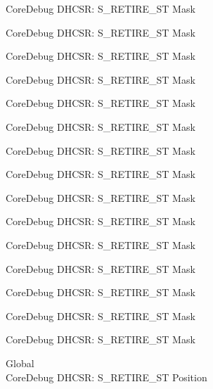 \begin{DoxyRefList}
\label{deprecated__deprecated000112}%
%
Core\+Debug DHCSR\+: S\+\_\+\+RETIRE\+\_\+\+ST Mask 

\label{deprecated__deprecated000166}%
%
Core\+Debug DHCSR\+: S\+\_\+\+RETIRE\+\_\+\+ST Mask 

\label{deprecated__deprecated000251}%
%
Core\+Debug DHCSR\+: S\+\_\+\+RETIRE\+\_\+\+ST Mask 

\label{deprecated__deprecated000308}%
%
Core\+Debug DHCSR\+: S\+\_\+\+RETIRE\+\_\+\+ST Mask 

\label{deprecated__deprecated000384}%
%
Core\+Debug DHCSR\+: S\+\_\+\+RETIRE\+\_\+\+ST Mask 

\label{deprecated__deprecated000463}%
%
Core\+Debug DHCSR\+: S\+\_\+\+RETIRE\+\_\+\+ST Mask 

\label{deprecated__deprecated000565}%
%
Core\+Debug DHCSR\+: S\+\_\+\+RETIRE\+\_\+\+ST Mask 

\label{deprecated__deprecated000690}%
%
Core\+Debug DHCSR\+: S\+\_\+\+RETIRE\+\_\+\+ST Mask 

\label{deprecated__deprecated000790}%
%
Core\+Debug DHCSR\+: S\+\_\+\+RETIRE\+\_\+\+ST Mask 

\label{deprecated__deprecated000844}%
%
Core\+Debug DHCSR\+: S\+\_\+\+RETIRE\+\_\+\+ST Mask 

\label{deprecated__deprecated000929}%
%
Core\+Debug DHCSR\+: S\+\_\+\+RETIRE\+\_\+\+ST Mask 

\label{deprecated__deprecated000986}%
%
Core\+Debug DHCSR\+: S\+\_\+\+RETIRE\+\_\+\+ST Mask 

\label{deprecated__deprecated001062}%
%
Core\+Debug DHCSR\+: S\+\_\+\+RETIRE\+\_\+\+ST Mask 

\label{deprecated__deprecated001141}%
%
Core\+Debug DHCSR\+: S\+\_\+\+RETIRE\+\_\+\+ST Mask 

\label{deprecated__deprecated001243}%
%
Core\+Debug DHCSR\+: S\+\_\+\+RETIRE\+\_\+\+ST Mask  
\item[Global \doxylink{group___c_m_s_i_s___core_debug_ga2328118f8b3574c871a53605eb17e730}{Core\+Debug\+\_\+\+DHCSR\+\_\+\+S\+\_\+\+RETIRE\+\_\+\+ST\+\_\+\+Pos} ]\hfill \\
\label{deprecated__deprecated000011}%
%
Core\+Debug DHCSR\+: S\+\_\+\+RETIRE\+\_\+\+ST Position 


\end{DoxyRefList}
